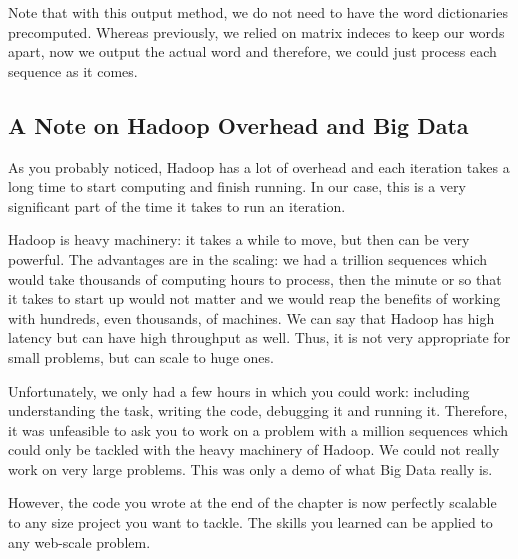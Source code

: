 Note that with this output method, we do not need to have the word dictionaries
precomputed. Whereas previously, we relied on matrix indeces to keep our words
apart, now we output the actual word and therefore, we could just process each
sequence as it comes.

\subsection{A Note on Hadoop Overhead and Big Data}

As you probably noticed, Hadoop has a lot of overhead and each iteration takes
a long time to start computing and finish running. In our case, this is a very
significant part of the time it takes to run an iteration.

Hadoop is heavy machinery: it takes a while to move, but then can be very
powerful. The advantages are in the scaling: we had a trillion sequences which
would take thousands of computing hours to process, then the minute or so that
it takes to start up would not matter and we would reap the benefits of working
with hundreds, even thousands, of machines. We can say that Hadoop has high
latency but can have high throughput as well. Thus, it is not very appropriate
for small problems, but can scale to huge ones.

Unfortunately, we only had a few hours in which you could work: including
understanding the task, writing the code, debugging it and running it.
Therefore, it was unfeasible to ask you to work on a problem with a million
sequences which could only be tackled with the heavy machinery of Hadoop.
We could not really work on very large problems. This was only a demo of what
Big Data really is.

However, the code you wrote at the end of the chapter is now perfectly scalable
to any size project you want to tackle. The skills you learned can be applied
to any web-scale problem.

